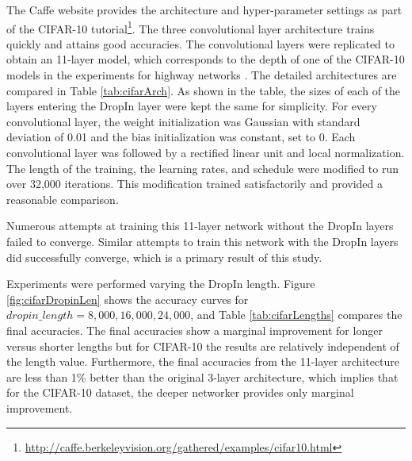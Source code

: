 \documentclass[10pt,twocolumn,letterpaper]{article}
\newcommand{\dropin}{DropIn }
\begin{document}
The Caffe \cite{Caffe14} website provides the architecture and hyper-parameter settings as part of the CIFAR-10 tutorial\footnote{\url{http://caffe.berkeleyvision.org/gathered/examples/cifar10.html}}.
The three convolutional layer architecture trains quickly and attains good accuracies.
The convolutional layers were replicated to obtain an 11-layer model, which corresponds to the depth of one of the CIFAR-10 models in the experiments for highway networks \cite{srivastava2015training}. 
The detailed architectures are compared in Table \ref{tab:cifarArch}.
As shown in the table, the sizes of each of the layers entering the \dropin layer were kept the same for simplicity.
For every convolutional layer, the weight initialization was Gaussian with standard deviation of 0.01 and the bias initialization was constant, set to 0.
Each convolutional layer was followed by a rectified linear unit and local normalization.
The length of the training, the learning rates, and schedule were modified to run over 32,000 iterations.
This modification trained satisfactorily and provided a reasonable comparison.

Numerous attempts at training this 11-layer network without the \dropin layers failed to converge.
Similar attempts to train this network with the \dropin layers did successfully converge, which is a primary result of this study.

Experiments were performed varying the \dropin length.
Figure \ref{fig:cifarDropinLen} shows the accuracy curves for $ dropin\_length = 8,000, 16,000, 24,000$,  and Table \ref{tab:cifarLengths} compares the final accuracies.
The final accuracies show a marginal improvement for longer versus shorter lengths but for CIFAR-10 the results are relatively independent of the length value.
Furthermore, the final accuracies from the 11-layer architecture are less than 1\% better than the original 3-layer architecture, which implies that for the CIFAR-10 dataset, the deeper networker  provides  only marginal improvement.
\end{document}
